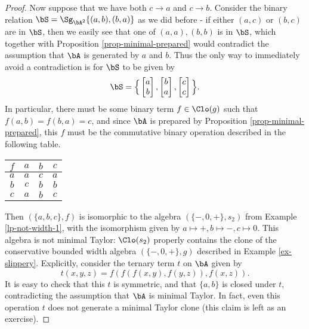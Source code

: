 \begin{proof}
Now suppose that we have both $c \rightarrow a$ and $c \rightarrow b$. Consider the binary relation $\bS = \Sg_{\bA^2}\{(a,b), (b,a)\}$ as we did before - if either $(a,c)$ or $(b,c)$ are in $\bS$, then we easily see that one of $(a,a), (b,b)$ is in $\bS$, which together with Proposition \ref{prop-minimal-prepared} would contradict the assumption that $\bA$ is generated by $a$ and $b$. Thus the only way to immediately avoid a contradiction is for $\bS$ to be given by
\[
\bS = \Big\{\begin{bmatrix}a\\ b\end{bmatrix},\begin{bmatrix}b\\ a\end{bmatrix},\begin{bmatrix}c\\ c\end{bmatrix}\Big\}.
\]
In particular, there must be some binary term $f \in \Clo(g)$ such that $f(a,b) = f(b,a) = c$, and since $\bA$ is prepared by Proposition \ref{prop-minimal-prepared}, this $f$ must be the commutative binary operation described in the following table.
\begin{center}
\begin{tabular}{c|ccc} $f$ & $a$ & $b$ & $c$\\ \hline $a$ & $a$ & $c$ & $a$\\ $b$ & $c$ & $b$ & $b$\\ $c$ & $a$ & $b$ & $c$\end{tabular}
\end{center}
Then $(\{a,b,c\},f)$ is isomorphic to the algebra $(\{-,0,+\},s_2)$ from Example \ref{lp-not-width-1}, with the isomorphism given by $a \mapsto +, b \mapsto -, c \mapsto 0$. This algebra is not minimal Taylor: $\Clo(s_2)$ properly contains the clone of the conservative bounded width algebra $(\{-,0,+\}, g)$ described in Example \ref{ex-slippery}. Explicitly, consider the ternary term $t$ on $\bA$ given by
\[
t(x,y,z) = f(f(f(x,y),f(y,z)), f(x,z)).
\]
It is easy to check that this $t$ is symmetric, and that $\{a,b\}$ is closed under $t$, contradicting the assumption that $\bA$ is minimal Taylor. In fact, even this operation $t$ does not generate a minimal Taylor clone (this claim is left as an exercise).
\end{proof}

